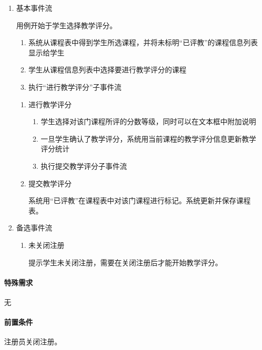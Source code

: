   \begin{enumerate}
    \item 基本事件流
    
    用例开始于学生选择教学评分。
    \begin{enumerate}[(1)]
      \item 系统从课程表中得到学生所选课程，并将未标明“已评教”的课程信息列表显示给学生
      \item 学生从课程信息列表中选择要进行教学评分的课程
      \item 执行“进行教学评分”子事件流
    \end{enumerate}
    
    \begin{enumerate}[{1}.1]
      \item 进行教学评分
      \begin{enumerate}[(1)]
        \item 学生选择对该门课程所评的分数等级，同时可以在文本框中附加说明
        \item 一旦学生确认了教学评分，系统用当前课程的教学评分信息更新教学评分统计
        \item 执行提交教学评分子事件流
      \end{enumerate}
      
      \item 提交教学评分
      
      \CJKindent 系统用“已评教”在课程表中对该门课程进行标记。系统更新并保存课程表。
    \end{enumerate}
    
    \item 备选事件流
    \begin{enumerate}[{2}.1]
      \item 未关闭注册
      
      \CJKindent 提示学生未关闭注册，需要在关闭注册后才能开始教学评分。
    \end{enumerate}
  \end{enumerate}
  
\paragraph{特殊需求}
  
无
  
\paragraph{前置条件}
  
注册员关闭注册。
  
